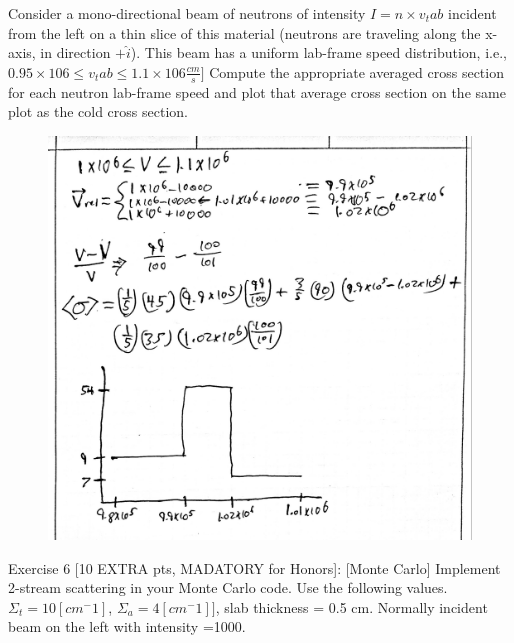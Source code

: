 \documentclass[12pt,fleqn, parskip=full]{scrartcl}
\begin{document}
Consider a mono-directional beam of neutrons of intensity $I = n \times v_tab$ incident from the left on a thin slice of this material (neutrons are traveling along the x-axis, in direction $+\hat{i}$). This beam has a uniform lab-frame speed distribution, i.e., $ 0.95 × 106 \leq v_tab \leq 1.1 × 106 \frac{cm}{s}]$ Compute the appropriate averaged cross section for each neutron lab-frame speed and plot that average cross section on the same plot as the cold cross section.
\begin{figure}[H]
	\centering
	\includegraphics[scale=.2]{Image_2_hw_1}
\end{figure}

Exercise 6 [10 EXTRA pts, MADATORY for Honors]: [Monte Carlo]
Implement 2-stream scattering in your Monte Carlo code. Use the following values. $\Sigma_t = 10 [cm^-1]$, $\Sigma_a = 4 [cm^-1]]$, slab thickness = 0.5 cm. Normally incident beam on the left with intensity =1000.
\end{document}
